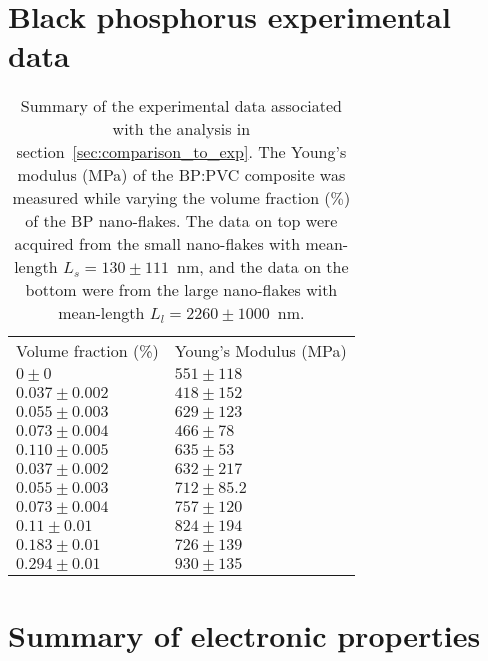 \clearpage
\section{Black phosphorus experimental data}
\label{sec:bp_experimental_data}


\begin{table}[htb!]
\centering
\begin{tabular}{ll}
\hline\hline
Volume fraction (\%) & Young's Modulus (MPa) \\
$0 	\pm0$ 		&$551\pm118$\\
$0.037\pm0.002$ 	&$418\pm152$\\
$0.055\pm0.003$ 	&$629\pm123$\\
$0.073\pm0.004$ 	&$466\pm78$\\
$0.110\pm0.005$	&$635\pm53$\\
\hline
$0.037\pm0.002$	&$632\pm217$\\
$0.055\pm0.003$	&$712\pm85.2$\\
$0.073\pm0.004$ 	&$757\pm120$\\
$0.11\pm0.01$ 		&$824\pm194$\\
$0.183\pm0.01$ 	&$726\pm139$\\
$0.294\pm0.01$ 	&$930\pm135$\\
\hline\hline
\end{tabular}
\caption{
Summary of the experimental data associated with 
the analysis in section~\ref{sec:comparison_to_exp}. 
%
The Young's modulus (MPa) of the BP:PVC 
composite was measured while varying the 
volume fraction ($\%$) of the BP nano-flakes.
%
The data on top were acquired from the small nano-flakes 
with mean-length $L_s=130\pm111$~nm, 
and the data on the bottom were from the large nano-flakes 
with mean-length $L_l=2260\pm1000$~nm. 
}
\label{table:bp_exp_data}
\end{table}


\clearpage
\section{Summary of electronic properties}
\label{sec:elec_properties}

